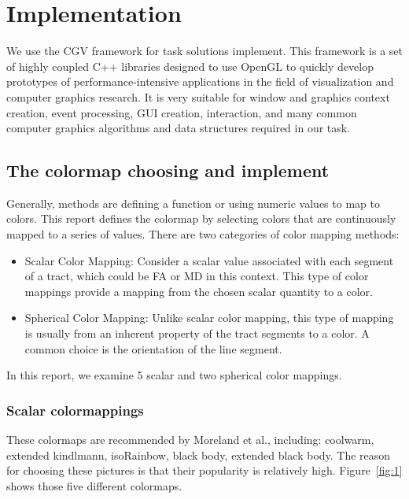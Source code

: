 \documentclass[hyperref, plainreport, noproblem]{cgvpub1}
\begin{document}
\clearpage
\chapter{Implementation}

We use the CGV framework for task solutions implement. This framework is a set of highly coupled C++ libraries designed to use OpenGL to quickly develop prototypes of performance-intensive applications in the field of visualization and computer graphics research. It is very suitable for window and graphics context creation, event processing, GUI creation, interaction, and many common computer graphics algorithms and data structures required in our task.

\section{The colormap choosing and implement}
Generally, methods are defining a function or using numeric values to map to colors. This report defines the colormap by selecting colors that are continuously mapped to a series of values. 
There are two categories of color mapping methods:
\begin{itemize}
	\item Scalar Color Mapping: Consider a scalar value associated with each segment of a tract, which could  be FA or MD in this context. This type of color mappings provide a mapping from the chosen scalar quantity to a color. 
	\item Spherical Color Mapping: Unlike scalar color mapping, this type of mapping is usually from an inherent property of the tract segments to a color. A common choice is the orientation of the line segment. 
\end{itemize}

In this report, we examine 5 scalar and two spherical color mappings. 

\subsection*{Scalar colormappings}

These colormaps are recommended by Moreland et al., including: coolwarm, extended kindlmann, isoRainbow, black body, extended black body. The reason for choosing these pictures is that their popularity is relatively high. Figure~\ref{fig:1} shows those five different colormaps.
\end{document}
